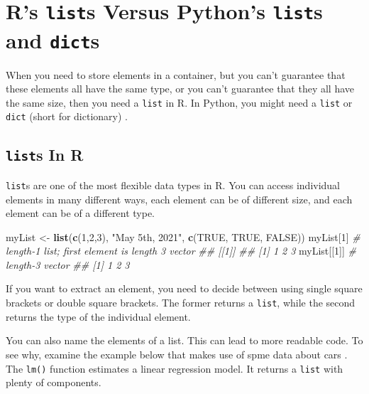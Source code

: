\documentclass[12pt,krantz2]{krantz}
\makeatletter
\newenvironment{Shaded}{\begin{snugshade}}{\end{snugshade}}
\newcommand{\CommentTok}[1]{\textcolor[rgb]{0.37,0.37,0.37}{\textit{#1}}}
\newcommand{\DecValTok}[1]{\textcolor[rgb]{0.06,0.06,0.06}{#1}}
\newcommand{\KeywordTok}[1]{\textcolor[rgb]{0.27,0.27,0.27}{\textbf{#1}}}
\newcommand{\NormalTok}[1]{#1}
\newcommand{\OtherTok}[1]{\textcolor[rgb]{0.37,0.37,0.37}{#1}}
\newcommand{\StringTok}[1]{\textcolor[rgb]{0.5,0.5,0.5}{#1}}
\newenvironment{kframe}{%
\medskip{}
\setlength{\fboxsep}{.8em}
 \def\at@end@of@kframe{}%
 \ifinner\ifhmode%
  \def\at@end@of@kframe{\end{minipage}}%
  \begin{minipage}{\columnwidth}%
 \fi\fi%
 \def\FrameCommand##1{\hskip\@totalleftmargin \hskip-\fboxsep
 \colorbox{shadecolor}{##1}\hskip-\fboxsep
     \hskip-\linewidth \hskip-\@totalleftmargin \hskip\columnwidth}%
 \MakeFramed {\advance\hsize-\width
   \@totalleftmargin\z@ \linewidth\hsize
   \@setminipage}}%
 {\par\unskip\endMakeFramed%
 \at@end@of@kframe}
\renewenvironment{Shaded}{\begin{kframe}}{\end{kframe}}
\makeatother
\begin{document}
\hypertarget{rs-lists-versus-pythons-lists-and-dicts}{%
\chapter{\texorpdfstring{R's \texttt{list}s Versus Python's \texttt{list}s and \texttt{dict}s}{R's lists Versus Python's lists and dicts}}\label{rs-lists-versus-pythons-lists-and-dicts}}

When you need to store elements in a container, but you can't guarantee that these elements all have the same type, or you can't guarantee that they all have the same size, then you need a \texttt{list} in R. In Python, you might need a \texttt{list} or \texttt{dict}  (short for dictionary) \citep{Lutz13}.

\hypertarget{lists-in-r}{%
\section{\texorpdfstring{\texttt{list}s In R}{lists In R}}\label{lists-in-r}}

\texttt{list}s are one of the most flexible data types in R. You can access individual elements in many different ways, each element can be of different size, and each element can be of a different type.

\begin{Shaded}
\begin{Highlighting}[]
\NormalTok{myList <-}\StringTok{ }\KeywordTok{list}\NormalTok{(}\KeywordTok{c}\NormalTok{(}\DecValTok{1}\NormalTok{,}\DecValTok{2}\NormalTok{,}\DecValTok{3}\NormalTok{), }\StringTok{"May 5th, 2021"}\NormalTok{, }\KeywordTok{c}\NormalTok{(}\OtherTok{TRUE}\NormalTok{, }\OtherTok{TRUE}\NormalTok{, }\OtherTok{FALSE}\NormalTok{))}
\NormalTok{myList[}\DecValTok{1}\NormalTok{] }\CommentTok{# length-1 list; first element is length 3 vector}
\CommentTok{## [[1]]}
\CommentTok{## [1] 1 2 3}
\NormalTok{myList[[}\DecValTok{1}\NormalTok{]] }\CommentTok{# length-3 vector}
\CommentTok{## [1] 1 2 3}
\end{Highlighting}
\end{Shaded}

If you want to extract an element, you need to decide between using single square brackets or double square brackets. The former returns a \texttt{list}, while the second returns the type of the individual element.

You can also name the elements of a list. This can lead to more readable code. To see why, examine the example below that makes use of spme data about cars \citep{sas_cars}. The \texttt{lm()} function estimates a linear regression model. It returns a \texttt{list} with plenty of components.
\end{document}
